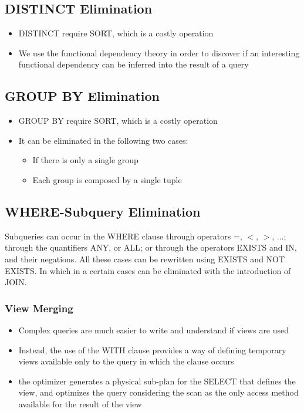 \subsection{DISTINCT Elimination}
\begin{itemize}
    \item DISTINCT require SORT, which is a costly operation
    \item We use the functional dependency theory in order to discover if an interesting functional dependency can be inferred into the result of a query
\end{itemize}

\subsection{GROUP BY Elimination}
\begin{itemize}
    \item GROUP BY require SORT, which is a costly operation
    \item It can be eliminated in the following two cases:
    \begin{itemize}
        \item If there is only a single group
        \item Each group is composed by a single tuple
    \end{itemize}
\end{itemize}

\subsection{WHERE-Subquery Elimination}
Subqueries can occur in the WHERE clause through operators =, $<$, $>$, ...; through the quantifiers ANY, or ALL; or through the operators EXISTS and IN, and their negations. All these cases can be rewritten using EXISTS and NOT EXISTS. In which in a certain cases can be eliminated with the introduction of JOIN.

\subsubsection{View Merging}
\begin{itemize}
    \item Complex queries are much easier to write and understand if views are used
    \item  Instead, the use of the WITH clause provides a way of defining temporary views available only to the query in which the clause occurs
    \item the optimizer generates a physical sub-plan for the SELECT that defines the view, and optimizes the query considering the scan as the only access method available for the result of the view
\end{itemize}

